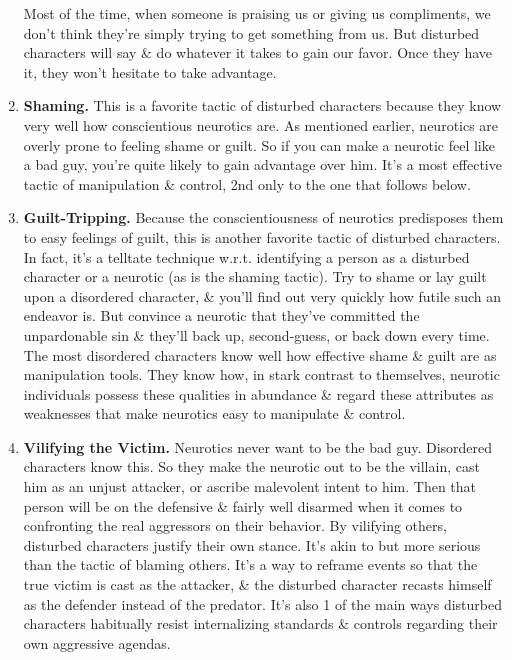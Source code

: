 \documentclass{article}
\numberwithin{equation}{section}
\begin{document}
\begin{enumerate}
	Most of the time, when someone is praising us or giving us compliments, we don't think they're simply trying to get something from us. But disturbed characters will say \& do whatever it takes to gain our favor. Once they have it, they won't hesitate to take advantage.
	\item \textbf{Shaming.} This is a favorite tactic of disturbed characters because they know very well how conscientious neurotics are. As mentioned earlier, neurotics are overly prone to feeling shame or guilt. So if you can make a neurotic feel like a bad guy, you're quite likely to gain advantage over him. It's a most effective tactic of manipulation \& control, 2nd only to the one that follows below.
	\item \textbf{Guilt-Tripping.} Because the conscientiousness of neurotics predisposes them to easy feelings of guilt, this is another favorite tactic of disturbed characters. In fact, it's a telltate technique w.r.t. identifying a person as a disturbed character or a neurotic (as is the shaming tactic). Try to shame or lay guilt upon a disordered character, \& you'll find out very quickly how futile such an endeavor is. But convince a neurotic that they've committed the unpardonable sin \& they'll back up, second-guess, or back down every time. The most disordered characters know well how effective shame \& guilt are as manipulation tools. They know how, in stark contrast to themselves, neurotic individuals possess these qualities in abundance \& regard these attributes as weaknesses that make neurotics easy to manipulate \& control.
	\item \textbf{Vilifying the Victim.} Neurotics never want to be the bad guy. Disordered characters know this. So they make the neurotic out to be the villain, cast him as an unjust attacker, or ascribe malevolent intent to him. Then that person will be on the defensive \& fairly well disarmed when it comes to confronting the real aggressors on their behavior. By vilifying others, disturbed characters justify their own stance. It's akin to but more serious than the tactic of blaming others. It's a way to reframe events so that the true victim is cast as the attacker, \& the disturbed character recasts himself as the defender instead of the predator. It's also 1 of the main ways disturbed characters habitually resist internalizing standards \& controls regarding their own aggressive agendas.

\end{enumerate}
\end{document}

